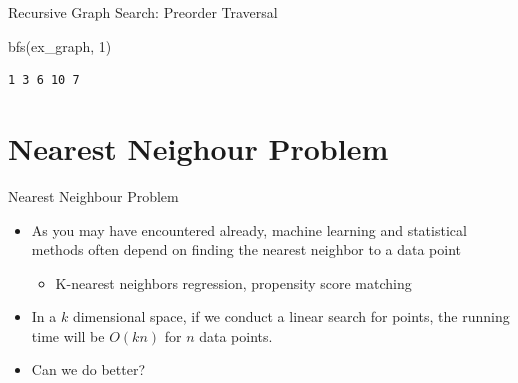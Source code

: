 \documentclass[
  ignorenonframetext,
]{beamer}
\newenvironment{Shaded}{\begin{snugshade}}{\end{snugshade}}
\newcommand{\DecValTok}[1]{\textcolor[rgb]{0.68,0.00,0.00}{#1}}
\newcommand{\NormalTok}[1]{\textcolor[rgb]{0.00,0.23,0.31}{#1}}
\providecommand{\tightlist}{%
  \setlength{\itemsep}{0pt}\setlength{\parskip}{0pt}}\usepackage{longtable,booktabs,array}
\begin{document}
\begin{frame}[fragile]{Recursive Graph Search: Preorder Traversal}
\protect\hypertarget{recursive-graph-search-preorder-traversal-1}{}
\begin{Shaded}
\begin{Highlighting}[]
\NormalTok{bfs(ex\_graph, }\DecValTok{1}\NormalTok{)}
\end{Highlighting}
\end{Shaded}

\begin{verbatim}
1 3 6 10 7 
\end{verbatim}
\end{frame}

\hypertarget{nearest-neighour-problem}{%
\section{Nearest Neighour Problem}\label{nearest-neighour-problem}}

\begin{frame}{Nearest Neighbour Problem}
\protect\hypertarget{nearest-neighbour-problem}{}
\begin{itemize}
\item
  As you may have encountered already, machine learning and statistical
  methods often depend on finding the nearest neighbor to a data point

  \begin{itemize}
  \tightlist
  \item
    K-nearest neighbors regression, propensity score matching
  \end{itemize}
\item
  In a \(k\) dimensional space, if we conduct a linear search for
  points, the running time will be \(O(kn)\) for \(n\) data points.
\item
  Can we do better?
\end{itemize}
\end{frame}
\end{document}
